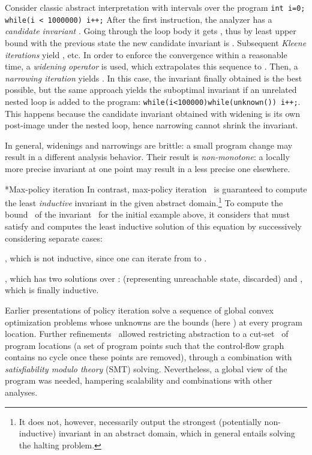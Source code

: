 \documentclass{llncs}
\makeatletter
\renewcommand{\paragraph}{\@startsection{paragraph}{4}{\z@}{0.8ex \@plus 0ex \@minus 1ex}{-1em}{\normalfont\normalsize\bfseries}}
\makeatother
\begin{document}
Consider classic abstract interpretation with intervals over the program
\texttt{int i=0; while(i < 1000000) i++;}
After the first instruction, the analyzer has a \emph{candidate invariant} . Going through the
loop body it gets , thus by least upper bound with the previous
state  the new candidate invariant is .
Subsequent \emph{Kleene iterations} yield ,  etc.
In order to enforce the convergence within a reasonable time, a \emph{widening operator} is used, which extrapolates this sequence to .
Then, a \emph{narrowing iteration} yields .
In this case, the invariant finally obtained is the best possible, but the same
approach yields the suboptimal invariant  if an unrelated nested loop
is added to the program: \texttt{while(i<100000){while(unknown()){} i++;}}.
This happens because the candidate invariant obtained with widening is its own post-image
under the nested loop, hence narrowing cannot shrink the invariant.

In general, widenings and narrowings are brittle: a
small program change may result in a different
analysis behavior. Their result is \emph{non-monotone}:
a locally more precise invariant at one point may result in a less precise one elsewhere.

\paragraph*{Max-policy iteration} In contrast, max-policy
iteration~\cite{max_strategy_templates} is
guaranteed to compute the least \emph{inductive} invariant in the given abstract
domain.\footnote{It does not, however, necessarily output the strongest (potentially
non-inductive) invariant in an abstract domain, which in general entails solving
the halting problem.}
To compute the bound~ of the invariant~ for the initial example above,
it considers that  must satisfy 
and computes the least inductive solution of this equation by successively considering separate cases:
\begin{compactenum}[(i)]
\item , which is not inductive, since one can iterate from  to .
\item ,
    which has two
    solutions over : 
    (representing unreachable state, discarded)
    and , which is finally inductive.
\end{compactenum}

Earlier presentations of policy iteration solve a sequence of global convex
optimization problems whose unknowns are the bounds (here ) at every
program location.
Further refinements~\cite{policy_iteration_path_focusing} allowed
restricting abstraction to a cut-set~\cite{cut_set}
of program locations (a set of program
points such that the control-flow graph contains no cycle once these points are
removed), through a combination with \emph{satisfiability modulo theory} (SMT)
solving.
Nevertheless, a global view of the program was
needed, hampering scalability and combinations with other analyses.
\end{document}
